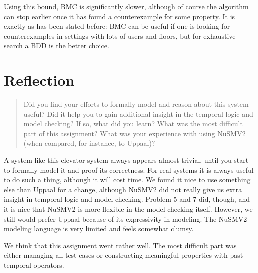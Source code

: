 \documentclass[a4paper,10pt]{article}
\begin{document}
	Using this bound, BMC is significantly slower, although of course the algorithm can stop earlier once it has found a counterexample for some property. It is exactly as has been stated before: BMC can be useful if one is looking for counterexamples in settings with lots of users and floors, but for exhaustive search a BDD is the better choice.
	
	\section{Reflection}

	\begin{quote}
	Did you find your efforts to formally model and reason about this system useful? Did it help you to gain additional insight in the temporal logic and model checking? If so, what did you learn? What was the most difficult part of this assignment? What was your experience with using NuSMV2 (when compared, for instance, to Uppaal)?
	\end{quote}

	A system like this elevator system always appears almost trivial, until you start to formally model it and proof its correctness. For real systems it is always useful to do such a thing, although it will cost time. We found it nice to use something else than Uppaal for a change, although NuSMV2 did not really give us extra insight in temporal logic and model checking. Problem 5 and 7 did, though, and it is nice that NuSMV2 is more flexible in the model checking itself. However, we still would prefer Uppaal because of its expressivity in modeling. The NuSMV2 modeling language is very limited and feels somewhat clumsy.

	We think that this assignment went rather well. The most difficult part was either managing all test cases or constructing meaningful properties with past temporal operators.
\end{document}
